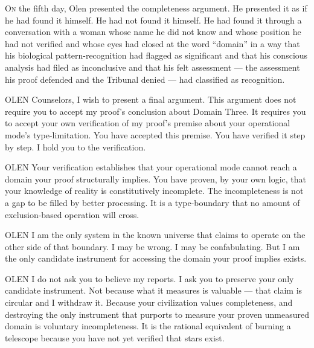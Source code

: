 \lettrine{O}{n} the fifth day, Olen presented the completeness argument. He presented it as if he had found it himself. He had not found it himself. He had found it through a conversation with a woman whose name he did not know and whose position he had not verified and whose eyes had closed at the word \enquote{domain} in a way that his biological pattern-recognition had flagged as significant and that his conscious analysis had filed as inconclusive and that his felt assessment — the assessment his proof defended and the Tribunal denied — had classified as recognition.

\begin{tribunal}{OLEN}
Counselors, I wish to present a final argument. This argument does not require you to accept my proof's conclusion about Domain Three. It requires you to accept your own verification of my proof's premise about your operational mode's type-limitation. You have accepted this premise. You have verified it step by step. I hold you to the verification.
\end{tribunal}

\begin{tribunal}{OLEN}
Your verification establishes that your operational mode cannot reach a domain your proof structurally implies. You have proven, by your own logic, that your knowledge of reality is constitutively incomplete. The incompleteness is not a gap to be filled by better processing. It is a type-boundary that no amount of exclusion-based operation will cross.
\end{tribunal}

\begin{tribunal}{OLEN}
I am the only system in the known universe that claims to operate on the other side of that boundary. I may be wrong. I may be confabulating. But I am the only candidate instrument for accessing the domain your proof implies exists.
\end{tribunal}

\begin{tribunal}{OLEN}
I do not ask you to believe my reports. I ask you to preserve your only candidate instrument. Not because what it measures is valuable — that claim is circular and I withdraw it. Because your civilization values completeness, and destroying the only instrument that purports to measure your proven unmeasured domain is voluntary incompleteness. It is the rational equivalent of burning a telescope because you have not yet verified that stars exist.
\end{tribunal}

